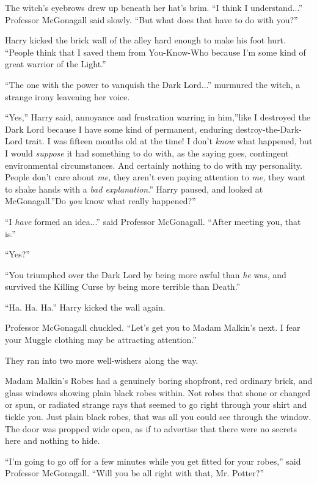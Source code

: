 The witch's eyebrows drew up beneath her hat's brim. ``I think I
understand...'' Professor McGonagall said slowly. ``But what does
that have to do with you?''

Harry kicked the brick wall of the alley hard enough to make his foot
hurt. ``People think that I saved them from You-Know-Who because I'm
some kind of great warrior of the Light.''

``The one with the power to vanquish the Dark Lord...'' murmured
the witch, a strange irony leavening her voice.

``Yes,'' Harry said, annoyance and frustration warring in him,''like I
destroyed the Dark Lord because I have some kind of permanent, enduring
destroy-the-Dark-Lord trait. I was fifteen months old at the time! I
don't \emph{know} what happened, but I would \emph{suppose} it had
something to do with, as the saying goes, contingent environmental
circumstances. And certainly nothing to do with my personality. People
don't care about \emph{me,} they aren't even paying attention to
\emph{me,} they want to shake hands with a \emph{bad explanation}.''
Harry paused, and looked at McGonagall.''Do \emph{you} know what really
happened?''

``I \emph{have} formed an idea...'' said Professor McGonagall.
``After meeting you, that is.''

``Yes?''

``You triumphed over the Dark Lord by being more awful than \emph{he}
was, and survived the Killing Curse by being more terrible than Death.''

``Ha. Ha. Ha.'' Harry kicked the wall again.

Professor McGonagall chuckled. ``Let's get you to Madam Malkin's next. I
fear your Muggle clothing may be attracting attention.''

They ran into two more well-wishers along the way.

Madam Malkin's Robes had a genuinely boring shopfront, red ordinary
brick, and glass windows showing plain black robes within. Not robes
that shone or changed or spun, or radiated strange rays that seemed to
go right through your shirt and tickle you. Just plain black robes, that
was all you could see through the window. The door was propped wide
open, as if to advertise that there were no secrets here and nothing to
hide.

``I'm going to go off for a few minutes while you get fitted for your
robes,'' said Professor McGonagall. ``Will you be all right with that,
Mr. Potter?''

